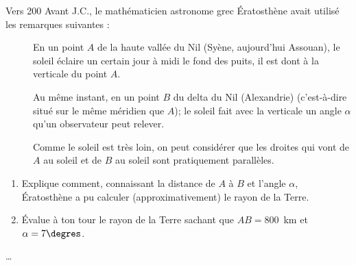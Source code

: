 \begin{exercice*}
Vers 200 Avant J.C., le mathématicien astronome grec \'Eratosthène avait utilisé les remarques suivantes :
\begin{description}
\item[] En un point $A$ de la haute vallée du Nil (Syène, aujourd'hui Assouan), le soleil éclaire un certain jour à midi le fond des puits, il est dont à la verticale du point $A$.
\item[] Au même instant, en un point $B$ du delta du Nil 
(Alexandrie) (c'est-à-dire situé sur le même méridien que $A$); le soleil fait avec la verticale un angle $\alpha$ qu'un observateur peut relever.
\item[] Comme le soleil est très loin, on peut considérer que les droites qui vont de $A$ au soleil et de $B$ au soleil sont pratiquement parallèles.
\end{description}
\begin{enumerate}
  \item Explique comment, connaissant la distance de $A$ à $B$ et l'angle $\alpha$, \'Eratosthène a pu calculer (approximativement) le rayon de la Terre.
\item \'Evalue à ton tour le rayon de la Terre sachant que $AB=800$~km et $\alpha=7\degres$.
\end{enumerate}
\end{exercice*}
\begin{corrige}
    \dots
\end{corrige}

